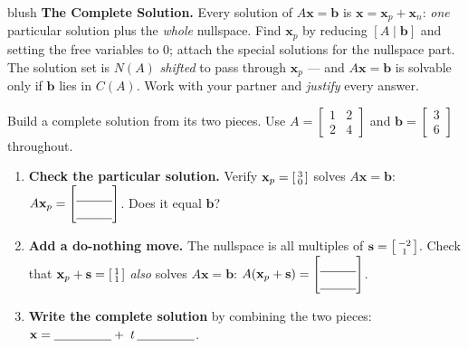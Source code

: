 \documentclass[10pt]{article}
\newcommand{\xx}{\mathbf{x}}
\newcommand{\bb}{\mathbf{b}}
\newcommand{\svec}{\mathbf{s}}
\begin{document}
\namepartnerperiod

\vspace{0.10in}

\begin{headlinebox}{blush}
\small\textbf{The Complete Solution.} Every solution of $A\xx=\bb$ is $\xx=\xx_p+\xx_n$: \emph{one}
particular solution plus the \emph{whole} nullspace. Find $\xx_p$ by reducing $[A\mid\bb]$ and setting
the free variables to $0$; attach the special solutions for the nullspace part. The solution set is
$N(A)$ \emph{shifted} to pass through $\xx_p$ --- and $A\xx=\bb$ is solvable only if $\bb$ lies in $C(A)$.
Work with your partner and \emph{justify} every answer.
\end{headlinebox}

\vspace{0.10in}

\begin{tcolorbox}[colback=white, colframe=black!40, title=\textbf{Tier R --- Remediate},
    fonttitle=\bfseries, arc=1.5mm, left=3mm, right=3mm, top=2mm, bottom=2mm, breakable]
Build a complete solution from its two pieces. Use $A=\begin{bmatrix} 1 & 2 \\ 2 & 4 \end{bmatrix}$ and
$\bb=\begin{bmatrix} 3 \\ 6 \end{bmatrix}$ throughout.
\begin{enumerate}[leftmargin=1.7em, itemsep=8pt]
  \item \textbf{Check the particular solution.} Verify $\xx_p=\begin{bsmallmatrix} 3\\0 \end{bsmallmatrix}$ solves $A\xx=\bb$:
        $A\xx_p=\begin{bmatrix}\rule{0pt}{1.0em}\blank{1.0cm}\\[2pt]\blank{1.0cm}\end{bmatrix}$. Does it equal $\bb$? \; \blank{1.4cm}
  \item \textbf{Add a do-nothing move.} The nullspace is all multiples of $\svec=\begin{bsmallmatrix} -2\\1 \end{bsmallmatrix}$.
        Check that $\xx_p+\svec=\begin{bsmallmatrix} 1\\1 \end{bsmallmatrix}$ \emph{also} solves $A\xx=\bb$:
        $A(\xx_p+\svec)=\begin{bmatrix}\rule{0pt}{1.0em}\blank{1.0cm}\\[2pt]\blank{1.0cm}\end{bmatrix}$. \; \blank{1.4cm}
  \item \textbf{Write the complete solution} by combining the two pieces:
        $\xx=\blank{1.6cm}+\;t\,\blank{1.6cm}$.
\end{enumerate}
\end{tcolorbox}
\end{document}
